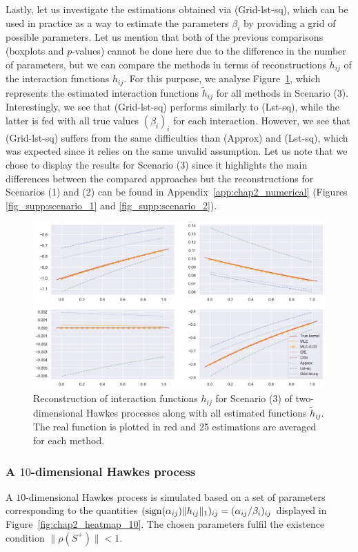      Lastly, let us investigate the estimations obtained via (Grid-lst-sq), which can be used in practice as a way to estimate the parameters $\beta_i$ by providing a grid of possible parameters.
     Let us mention that both of the previous comparisons (boxplots and \(p\)-values) cannot be done here due to the difference in the number of parameters, but we can compare the methods in terms of
     reconstructions $\tilde h_{ij}$ of the interaction functions $h_{ij}$.
     For this purpose, we analyse Figure~\ref{fig:chap2_reconstruction_param_1}, which represents the estimated interaction functions \(\tilde h_{ij}\) for all methods in Scenario (3).
     Interestingly, we see that (Grid-lst-sq) performs similarly to (Lst-sq),
     while the latter is fed with all true values \((\beta_i)_i\) for each interaction.
     However, we see that (Grid-lst-sq)  suffers from the same difficulties than (Approx) and (Lst-sq), which was expected since it relies on the same unvalid assumption.
     Let us note that we chose to display the results for Scenario (3) since it highlights the main differences between the compared approaches but the reconstructions for Scenarios (1) and (2)
     can be found in Appendix~\ref{app:chap2_numerical}
     (Figures \ref{fig_supp:scenario_1} and \ref{fig_supp:scenario_2}).
     
     {\begin{figure}[!ht]
     \centering
     \includegraphics[width=0.9\linewidth]{images/chapter3/reconstruction_param_3.pdf}
     \caption{Reconstruction of interaction functions $h_{ij}$ for Scenario (3) of two-dimensional Hawkes processes along with all estimated functions $\tilde h_{ij}$. The real function is plotted in red and 25 estimations are averaged for each method.}
     \label{fig:chap2_reconstruction_param_1}
     \end{figure}}


  \subsubsection{A $10$-dimensional Hawkes process}
    A \(10\)-dimensional Hawkes process is simulated based on a set of parameters corresponding to the quantities $(\operatorname{sign}(\alpha_{ij})\|h_{ij}\|_1)_{ij} = (\alpha_{ij}/\beta_i)_{ij}$ displayed in Figure~\ref{fig:chap2_heatmap_10}.
    The chosen parameters fulfil the existence condition $\|\rho(S^+)\| < 1$.

